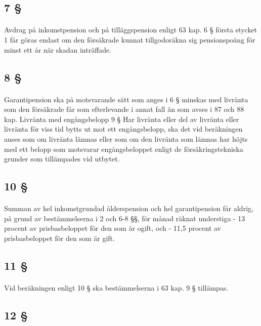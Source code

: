 \documentclass[a4paper,notitlepage,openany,10pt]{book}
\begin{document}
\subsection*{7 §}
\paragraph*{}
Avdrag på inkomstpension och på tilläggspension enligt 63 kap. 6 § första stycket 1 får göras endast om den försäkrade kunnat tillgodoräkna sig pensionspoäng för minst ett år när skadan inträffade.
\subsection*{8 §}
\paragraph*{}
Garantipension ska på motsvarande sätt som anges i 6 § minskas med livränta som den försäkrade får som efterlevande i annat fall än som avses i 87 och 88 kap.
Livränta med engångsbelopp 9 § Har livränta eller del av livränta eller livränta för viss tid bytts ut mot ett engångsbelopp, ska det vid beräkningen anses som om livränta lämnas eller som om den livränta som lämnas har höjts med ett belopp som motsvarar engångsbeloppet enligt de försäkringstekniska grunder som tillämpades vid utbytet.
\subsection*{10 §}
\paragraph*{}
Summan av hel inkomstgrundad ålderspension och hel garantipension får aldrig, på grund av bestämmelserna i 2 och 6-8 §§, för månad räknat understiga
\newline - 13 procent av prisbasbeloppet för den som är ogift, och
\newline - 11,5 procent av prisbasbeloppet för den som är gift.
\subsection*{11 §}
\paragraph*{}
Vid beräkningen enligt 10 § ska bestämmelserna i 63 kap. 9 § tillämpas.
\subsection*{12 §}
\end{document}
